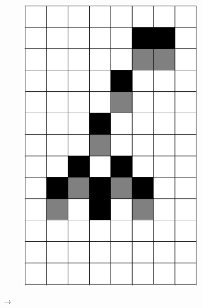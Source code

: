 \documentclass[12pt]{article}
\numberwithin{figure}{section} %
\begin{document}
\begin{figure}[H]
\begin{subfigure}{0.3\textwidth}
     \includegraphics[angle=270,width=\linewidth]{Section4/13.2}
     \subcaption{}
   \end{subfigure}
      {\LARGE$\xrightarrow{}$}
      \newline
   \setcounter{subfigure}{0}
     \begin{subfigure}{0.3\textwidth}
     \centering

\end{subfigure}
\end{figure}
\end{document}

